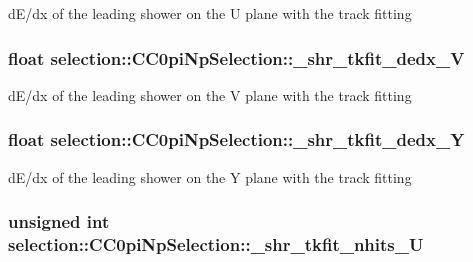 d\-E/dx of the leading shower on the U plane with the track fitting \hypertarget{classselection_1_1CC0piNpSelection_a428fc549513bea0e1ca92cf90c1148cd}{
\subsubsection[{\-\_\-shr\-\_\-tkfit\-\_\-dedx\-\_\-\-V}]{\setlength{\rightskip}{0pt plus 5cm}float selection\-::\-C\-C0pi\-Np\-Selection\-::\-\_\-shr\-\_\-tkfit\-\_\-dedx\-\_\-\-V\hspace{0.3cm}{\ttfamily [private]}}}\label{classselection_1_1CC0piNpSelection_a428fc549513bea0e1ca92cf90c1148cd}
d\-E/dx of the leading shower on the V plane with the track fitting \hypertarget{classselection_1_1CC0piNpSelection_ababbbc32babdef645c2edc613713ceb7}{
\subsubsection[{\-\_\-shr\-\_\-tkfit\-\_\-dedx\-\_\-\-Y}]{\setlength{\rightskip}{0pt plus 5cm}float selection\-::\-C\-C0pi\-Np\-Selection\-::\-\_\-shr\-\_\-tkfit\-\_\-dedx\-\_\-\-Y\hspace{0.3cm}{\ttfamily [private]}}}\label{classselection_1_1CC0piNpSelection_ababbbc32babdef645c2edc613713ceb7}
d\-E/dx of the leading shower on the Y plane with the track fitting \hypertarget{classselection_1_1CC0piNpSelection_a6c75f5783174133ce97849f128f3dee3}{
\subsubsection[{\-\_\-shr\-\_\-tkfit\-\_\-nhits\-\_\-\-U}]{\setlength{\rightskip}{0pt plus 5cm}unsigned int selection\-::\-C\-C0pi\-Np\-Selection\-::\-\_\-shr\-\_\-tkfit\-\_\-nhits\-\_\-\-U\hspace{0.3cm}{\ttfamily [private]}}}\label{classselection_1_1CC0piNpSelection_a6c75f5783174133ce97849f128f3dee3}
